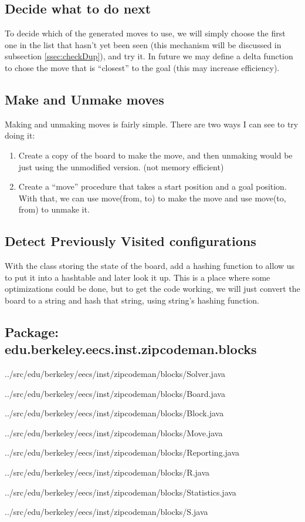 \documentclass[a4paper]{article}
\newcommand{\sourceRoot}{../src/}
\newcommand{\myPackage}{}
\newcommand{\myJPackage}{}
\newcommand{\sourcePackage}[2]{  \subsection*{Package: #2}
                                 \renewcommand{\myPackage}{#1}
                                 \renewcommand{\myJPackage}{#2}}
\newcommand{\sourceClass}[1]{    
                                 {\sourceRoot\myPackage/#1}}
\begin{document}
\subsection{Decide what to do next}
To decide which of the generated moves to use, we will simply choose the first 
one in the list that hasn't yet been seen (this mechanism will be discussed in 
subsection \ref{ssec:checkDup}), and try it. In future we may define a delta 
function to chose the move that is ``closest'' to the goal (this may increase 
efficiency).

\subsection{Make and Unmake moves}
Making and unmaking moves is fairly simple. There are two ways I can see to try 
doing it: 
\begin{enumerate}
\item Create a copy of the board to make the move, and then unmaking would be 
      just using the unmodified version.  (not memory efficient)
\item Create a ``move'' procedure that takes a start position and a goal 
      position. With that, we can use move(from, to) to make the move and use 
      move(to, from) to unmake it. 
\end{enumerate}

\subsection{Detect Previously Visited configurations}
With the class storing the state of the board, add a hashing function to allow 
us to put it into a hashtable and later look it up. This is a place where some 
optimizations could be done, but to get the code working, we will just convert 
the board to a string and hash that string, using string's hashing function. 
\label{ssec:checkDup}


\sourcePackage{edu/berkeley/eecs/inst/zipcodeman/blocks}
		      {edu.berkeley.eecs.inst.zipcodeman.blocks}
\sourceClass{Solver.java}
\sourceClass{Board.java}
\sourceClass{Block.java}
\sourceClass{Move.java}
\sourceClass{Reporting.java}
\sourceClass{R.java}
\sourceClass{Statistics.java}
\sourceClass{S.java}
 
\end{document}
